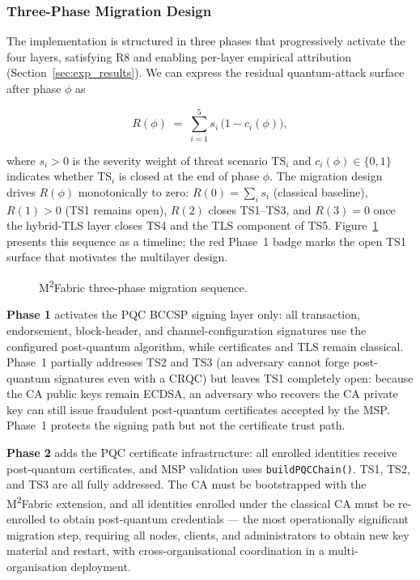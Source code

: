 \documentclass{ieeetj}
\newcommand{\mfabric}{M\textsuperscript{2}Fabric}
\begin{document}
\subsubsection{Three-Phase Migration Design}

The implementation is structured in three phases that progressively activate the
four layers, satisfying R8 and enabling per-layer empirical attribution
(Section~\ref{sec:exp_results}). We can express the residual quantum-attack
surface after phase $\phi$ as

\begin{equation}
R(\phi) \;=\; \sum_{i=1}^{5} s_i\,\bigl(1 - c_i(\phi)\bigr),
\label{eq:residual_surface}
\end{equation}

where $s_i>0$ is the severity weight of threat scenario $\mathrm{TS}_i$ and
$c_i(\phi)\in\{0,1\}$ indicates whether $\mathrm{TS}_i$ is closed at the end of
phase $\phi$. The migration design drives $R(\phi)$ monotonically to zero:
$R(0)=\sum_i s_i$ (classical baseline), $R(1)>0$ (TS1 remains open),
$R(2)$ closes TS1--TS3, and $R(3)=0$ once the hybrid-TLS layer closes TS4 and the
TLS component of TS5. Figure~\ref{fig:phase_migration_design} presents this
sequence as a timeline; the red Phase~1 badge marks the open TS1 surface that
motivates the multilayer design.

\begin{figure}[ht]
\centering

\caption{M\textsuperscript{2}Fabric three-phase migration sequence.}
\label{fig:phase_migration_design}
\end{figure}

\textbf{Phase 1} activates the PQC BCCSP signing layer only: all transaction,
endorsement, block-header, and channel-configuration signatures use the
configured post-quantum algorithm, while certificates and TLS remain classical.
Phase~1 partially addresses TS2 and TS3 (an adversary cannot forge post-quantum
signatures even with a CRQC) but leaves TS1 completely open: because the CA
public keys remain ECDSA, an adversary who recovers the CA private key can still
issue fraudulent post-quantum certificates accepted by the MSP. Phase~1 protects
the signing path but not the certificate trust path.

\textbf{Phase 2} adds the PQC certificate infrastructure: all enrolled
identities receive post-quantum certificates, and MSP validation uses
\texttt{buildPQCChain()}. TS1, TS2, and TS3 are all fully addressed. The CA must
be bootstrapped with the \mfabric{} extension, and all identities enrolled under
the classical CA must be re-enrolled to obtain post-quantum credentials --- the
most operationally significant migration step, requiring all nodes, clients, and
administrators to obtain new key material and restart, with cross-organisational
coordination in a multi-organisation deployment.
\end{document}
